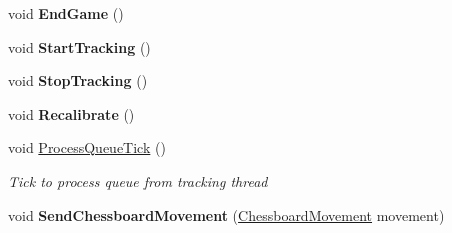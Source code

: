 \begin{DoxyCompactItemize}
void {\bfseries End\+Game} ()
\item 
\mbox{\label{class_chess_tracking_1_1_user_interface_1_1_user_interface_input_facade_ab5371578612ba35198eb5de2fa2aaff7}} 
void {\bfseries Start\+Tracking} ()
\item 
\mbox{\label{class_chess_tracking_1_1_user_interface_1_1_user_interface_input_facade_ac713da3cc4f893c5fcec13b44e2f09f1}} 
void {\bfseries Stop\+Tracking} ()
\item 
\mbox{\label{class_chess_tracking_1_1_user_interface_1_1_user_interface_input_facade_a5045f3d0e315abf1010dbe05a823978c}} 
void {\bfseries Recalibrate} ()
\item 
void \mbox{\hyperlink{class_chess_tracking_1_1_user_interface_1_1_user_interface_input_facade_a1f17a5883cc0d513edd5a1e400087a7e}{Process\+Queue\+Tick}} ()
\begin{DoxyCompactList}\small\item\em Tick to process queue from tracking thread \end{DoxyCompactList}\item 
\mbox{\label{class_chess_tracking_1_1_user_interface_1_1_user_interface_input_facade_a7e36f7aeec76ff56be7caa35750273bc}} 
void {\bfseries Send\+Chessboard\+Movement} (\mbox{\hyperlink{namespace_chess_tracking_1_1_multithreading_messages_1_1_to_processing_af48751428f7a12d314dbbac688726bac}{Chessboard\+Movement}} movement)
\end{DoxyCompactItemize}
